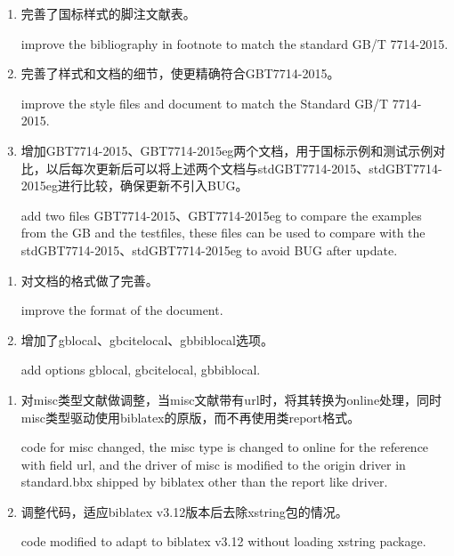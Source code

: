 \label{up:190119}
\begin{enumerate}

\item 完善了国标样式的脚注文献表。

improve the bibliography in footnote to match the standard GB/T 7714-2015.

\item 完善了样式和文档的细节，使更精确符合GBT7714-2015。

improve the style files and document to match the Standard GB/T 7714-2015.

\item 增加GBT7714-2015、GBT7714-2015eg两个文档，用于国标示例和测试示例对比，以后每次更新后可以将上述两个文档与stdGBT7714-2015、stdGBT7714-2015eg进行比较，确保更新不引入BUG。

add two files GBT7714-2015、GBT7714-2015eg to compare the examples from the GB and the testfiles, these files can be used to compare with the stdGBT7714-2015、stdGBT7714-2015eg to avoid BUG after update.


\end{enumerate}


\label{up:181222}
\begin{enumerate}

\item 对文档的格式做了完善。

improve the format of the document.

\item 增加了gblocal、gbcitelocal、gbbiblocal选项。

add options gblocal, gbcitelocal, gbbiblocal.


\end{enumerate}



\label{up:181104}
\begin{enumerate}

\item 对misc类型文献做调整，当misc文献带有url时，将其转换为online处理，同时misc类型驱动使用biblatex的原版，而不再使用类report格式。

code for misc changed, the misc type is changed to online for the reference with field url, and the driver of misc is modified to the origin driver in standard.bbx shipped by biblatex other than the report like driver.


\item 调整代码，适应biblatex v3.12版本后去除xstring包的情况。

code modified to adapt to biblatex v3.12 without loading xstring package.


\end{enumerate}


